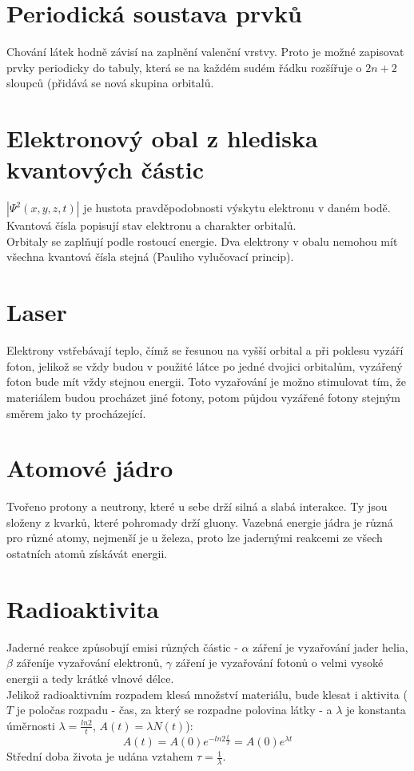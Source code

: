 \documentclass[titlepage]{report}
\begin{document}
\section{Periodická soustava prvků}
Chování látek hodně závisí na zaplnění valenční vrstvy. Proto je možné zapisovat prvky periodicky do tabuly, která se na každém sudém řádku rozšířuje o $2n + 2$ sloupců (přidává se nová skupina orbitalů.
\section{Elektronový obal z hlediska kvantových částic}
$|\Psi^2(x,y,z,t)|$ je hustota pravděpodobnosti výskytu elektronu v daném bodě. Kvantová čísla popisují stav elektronu a charakter orbitalů.\\
Orbitaly se zaplňují podle rostoucí energie. Dva elektrony v obalu nemohou mít všechna kvantová čísla stejná (Pauliho vylučovací princip).
\section{Laser}
Elektrony vstřebávají teplo, čímž se řesunou na vyšší orbital a při poklesu vyzáří foton, jelikož se vždy budou v použité látce po jedné dvojici orbitalům, vyzářený foton bude mít vždy stejnou energii. Toto vyzařování je možno stimulovat tím, že materiálem budou procházet jiné fotony, potom půjdou vyzářené fotony stejným směrem jako ty procházející.
\section{Atomové jádro}
Tvořeno protony a neutrony, které u sebe drží silná a slabá interakce. Ty jsou složeny z kvarků, které pohromady drží gluony. Vazebná energie jádra je různá pro různé atomy, nejmenší je u železa, proto lze jadernými reakcemi ze všech ostatních atomů získávát energii.
\section{Radioaktivita}
Jaderné reakce způsobují emisi různých částic - $\alpha$ záření je vyzařování jader helia, $\beta$ zářeníje vyzařování elektronů, $\gamma$ záření je vyzařování fotonů o velmi vysoké energii a tedy krátké vlnové délce.\\
Jelikož radioaktivním rozpadem klesá množství materiálu, bude klesat i aktivita ($T$ je poločas rozpadu - čas, za který se rozpadne polovina látky - a $\lambda$ je konstanta úměrnosti $\lambda = \frac{ln2}{t}$, $A(t) = \lambda N(t)$):\\
\begin{equation}
A(t) = A(0)e^{-ln2 \frac{t}{T}} = A(0)e^{\lambda t}
\end{equation}
Střední doba života je udána vztahem $\tau = \frac{1}{\lambda}$.
\end{document}
